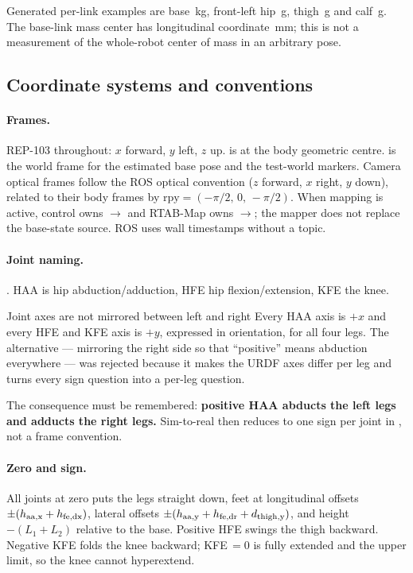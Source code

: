 \documentclass[11pt,a4paper]{article}
\begin{document}
Generated per-link examples are base \RdMassBase\,kg, front-left hip
\RdMassHip\,g, thigh \RdMassThigh\,g and calf \RdMassCalf\,g. The base-link
mass center has longitudinal coordinate \RdComX\,mm; this is not a measurement
of the whole-robot center of mass in an arbitrary pose.

\subsection{Coordinate systems and conventions}
\label{sec:conventions}

\paragraph{Frames.} REP-103 throughout: $x$ forward, $y$ left, $z$ up.
 is at the body geometric centre.  is the world
frame for the estimated base pose and the test-world markers. Camera optical
frames follow the ROS optical convention ($z$ forward, $x$ right, $y$ down),
related to their body frames by $\mathrm{rpy} = (-\pi/2,\, 0,\, -\pi/2)$.
When mapping is active, control owns $\to$
and RTAB-Map owns $\to$; the mapper does not replace
the base-state source. ROS uses wall timestamps without a  topic.

\paragraph{Joint naming.} .
HAA is hip abduction/adduction, HFE hip flexion/extension, KFE the knee.

\begin{decision}{Joint axes are not mirrored between left and right}
Every HAA axis is $+x$ and every HFE and KFE axis is $+y$, expressed in
 orientation, for all four legs. The alternative --- mirroring
the right side so that ``positive'' means abduction everywhere --- was rejected
because it makes the URDF axes differ per leg and turns every sign question into
a per-leg question.

The consequence must be remembered: \textbf{positive HAA abducts the left legs
and adducts the right legs.} Sim-to-real then reduces to one sign per joint in
, not a frame convention.
\end{decision}

\paragraph{Zero and sign.} All joints at zero puts the legs straight down, feet
at longitudinal offsets $\pm(h_{\rm aa,x}+h_{\rm fe,dx})$, lateral offsets
$\pm(h_{\rm aa,y}+h_{\rm fe,dr}+d_{\rm thigh,y})$, and height
$-(L_1+L_2)$ relative to the base. Positive HFE swings the thigh
backward. Negative KFE folds the knee backward; KFE\,$=0$ is fully extended and
the upper limit, so the knee cannot hyperextend.
\end{document}
